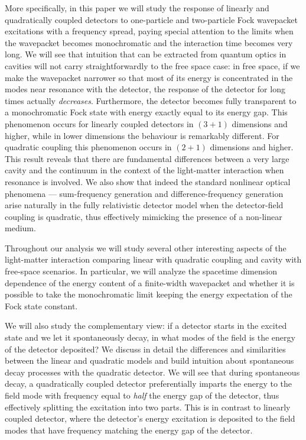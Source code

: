 \documentclass[11pt,prd,onecolumn,superscriptaddress,nofootinbib,floatfix,amsmath,amssymb]{revtex4-2}
\begin{document}
    More specifically, in this paper we will study the response of linearly and quadratically coupled detectors to one-particle and two-particle Fock wavepacket excitations with a frequency spread, paying special attention to the limits when the wavepacket becomes monochromatic and the interaction time becomes very long. We will see that intuition that can be extracted from quantum optics in cavities will not carry straightforwardly to the free space case: in free space, if we make the wavepacket narrower so that most of its energy is concentrated in the modes near resonance with the detector, the response of the detector for long times actually \textit{decreases}. Furthermore, the detector becomes fully transparent to a monochromatic Fock state with energy exactly equal to its energy gap. This phenomenon occurs for linearly coupled detectors in $(3+1)$ dimensions and higher, while in lower dimensions the behaviour is remarkably different. For quadratic coupling this phenomenon occurs in $(2+1)$ dimensions and higher. This result reveals that there are fundamental differences between a very large cavity and the continuum in the context of the light-matter interaction when resonance is involved. We also show that indeed the standard nonlinear optical phenomena --- {sum-frequency generation} and {difference-frequency generation} arise naturally in the fully relativistic detector model when the detector-field coupling is quadratic, thus effectively mimicking the presence of a non-linear medium.
    
    Throughout our analysis we will study several other interesting aspects of the light-matter interaction comparing linear with quadratic coupling and cavity with free-space scenarios. In particular, we will analyze the spacetime dimension dependence of the energy content of a finite-width wavepacket and whether it is possible to take the monochromatic limit keeping the energy expectation of the Fock state constant. 
    
    We will also study the complementary view: if a detector starts in the excited state and we let it spontaneously decay, in what modes of the field is the energy of the detector deposited? We discuss in detail the differences and similarities between the linear and quadratic models and build intuition about spontaneous decay processes with the quadratic detector. We will see that during spontaneous decay, a quadratically coupled detector preferentially imparts the energy to the field mode with frequency equal to \textit{half} the energy gap of the detector, thus effectively splitting the excitation into two parts. This is in contrast to linearly coupled detector, where the detector's energy excitation is deposited to the field modes that have frequency matching the energy gap of the detector.
    
\end{document}
